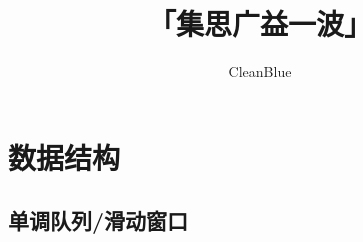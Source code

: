 \documentclass[twocolumn,a4]{article}
\title{\CJKfamily{hei} \bfseries 「集思广益一波」}
\author{CleanBlue}
\newcommand{\addcpp}[1]{}
\begin{document}
 \small
\begin{titlepage}
\maketitle
\end{titlepage}

\newpage
\pagestyle{empty}
\renewcommand{\contentsname}{目录}
\tableofcontents
\newpage\clearpage
\newpage
\pagestyle{fancy}
\setcounter{page}{1}   %

\section{数据结构}
	\subsection{单调队列/滑动窗口}
		\addcpp{ds/SlidingWindow.tex}
			
\end{document}
